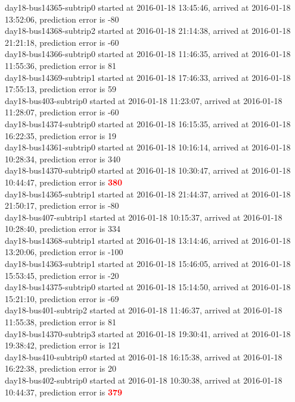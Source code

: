 \documentclass[12pt,a4paper,oneside,openright]{report}
\begin{document}
{\footnotesize
day18-bus14365-subtrip0 started at 2016-01-18 13:45:46, arrived at 2016-01-18 13:52:06, prediction error is -80 \\
day18-bus14368-subtrip2 started at 2016-01-18 21:14:38, arrived at 2016-01-18 21:21:18, prediction error is -60 \\
day18-bus14366-subtrip0 started at 2016-01-18 11:46:35, arrived at 2016-01-18 11:55:36, prediction error is 81 \\
day18-bus14369-subtrip1 started at 2016-01-18 17:46:33, arrived at 2016-01-18 17:55:13, prediction error is 59 \\
day18-bus403-subtrip0 started at 2016-01-18 11:23:07,    arrived at 2016-01-18 11:28:07, prediction error is -60 \\
day18-bus14374-subtrip0 started at 2016-01-18 16:15:35, arrived at 2016-01-18 16:22:35, prediction error is 19 \\
day18-bus14361-subtrip0 started at 2016-01-18 10:16:14, arrived at 2016-01-18 10:28:34, prediction error is 340 \\
day18-bus14370-subtrip0 started at 2016-01-18 10:30:47, arrived at 2016-01-18 10:44:47, prediction error is \textcolor{red}{\textbf{380}} \\ 
day18-bus14365-subtrip1 started at 2016-01-18 21:44:37, arrived at 2016-01-18 21:50:17, prediction error is -80 \\
day18-bus407-subtrip1 started at 2016-01-18 10:15:37,    arrived at 2016-01-18 10:28:40, prediction error is 334 \\
day18-bus14368-subtrip1 started at 2016-01-18 13:14:46, arrived at 2016-01-18 13:20:06, prediction error is -100 \\
day18-bus14363-subtrip1 started at 2016-01-18 15:46:05, arrived at 2016-01-18 15:53:45, prediction error is -20 \\
day18-bus14375-subtrip0 started at 2016-01-18 15:14:50, arrived at 2016-01-18 15:21:10, prediction error is -69 \\
day18-bus401-subtrip2 started at 2016-01-18 11:46:37,    arrived at 2016-01-18 11:55:38, prediction error is 81 \\
day18-bus14370-subtrip3 started at 2016-01-18 19:30:41, arrived at 2016-01-18 19:38:42, prediction error is 121 \\
day18-bus410-subtrip0 started at 2016-01-18 16:15:38,    arrived at 2016-01-18 16:22:38, prediction error is 20 \\
day18-bus402-subtrip0 started at 2016-01-18 10:30:38,    arrived at 2016-01-18 10:44:37, prediction error is \textcolor{red}{\textbf{379}} \\
}
\end{document}
